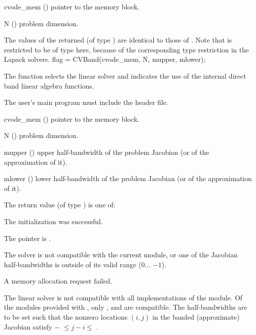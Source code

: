 {
  \begin{args}
  \item[cvode\_mem] ()
    pointer to the {\cvodes} memory block.
  \item[N] ()
    problem dimension.
  \end{args}
}
{
  The values of the returned  (of type ) are identical
  to those of .
}
{
  Note that  is restricted to be of type  here, because
  of the corresponding type restriction in the Lapack solvers.
}
{
  flag = CVBand(cvode\_mem, N, mupper, mlower);
}
{
  The function  selects the {\cvband} linear solver and indicates
  the use of the internal direct band linear algebra functions.

  The user's main program must include the  header file.
}
{
  \begin{args}
  \item[cvode\_mem] ()
    pointer to the {\cvodes} memory block.
  \item[N] ()
    problem dimension.
  \item[mupper] ()
    upper half-bandwidth of the problem Jacobian (or of the approximation of it).
  \item[mlower] ()
    lower half-bandwidth of the problem Jacobian (or of the approximation of it).
  \end{args}
}
{
  The return value  (of type ) is one of:
  \begin{args}
  \item[\Id{CVDLS\_SUCCESS}] 
    The {\cvband} initialization was successful.
  \item[\Id{CVDLS\_MEM\_NULL}]
    The  pointer is .
  \item[\Id{CVDLS\_ILL\_INPUT}]
    The {\cvband} solver is not compatible with the current {\nvector} module, or
    one of the Jacobian half-bandwidths is outside of its valid range
    ($0 \ldots$ $-1$).
  \item[\Id{CVDLS\_MEM\_FAIL}]
    A memory allocation request failed.
  \end{args}
}
{
  The {\cvband} linear solver is not compatible with all
  implementations of the {\nvector} module. 
  Of the {\nvector} modules provided with {\sundials}, only {\nvecs},
  {\nvecopenmp} and {\nvecpthreads} are compatible.
  The half-bandwidths are to be set such that the nonzero locations $(i,j)$ in the
  banded (approximate) Jacobian satisfy $-$ $\leq j-i \leq$ .
}
